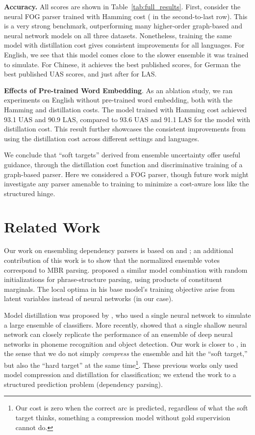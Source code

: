 \documentclass[11pt,letterpaper]{article}
\newcommand{\ignore}[1]{}
\newcommand{\lingpengcomment}[1]{\ignore{\textcolor{green}{{\textbf{[#1 --\textsc{lpk}]}}}}}
\newcommand{\miguelcomment}[1]{\ignore{\textcolor{red}{{\textbf{[#1 --\textsc{miguel}]}}}}}
\begin{document}
\textbf{Accuracy.}  All scores are shown in Table~\ref{tab:full_results}.
First, consider the neural FOG parser trained with Hamming cost ( in the second-to-last row).  This is a very strong benchmark, \ignore{\miguelcomment{Difficult to call it "baseline" if it is the best result reported...}}outperforming many higher-order graph-based and neural network models on all three datasets.  Nonetheless, training the same model with distillation cost gives consistent improvements for all languages.
For English, we see that this model comes close to the slower ensemble it was trained to simulate.  For Chinese, it achieves the best published scores, for German the best published UAS scores, and just after  for LAS.

\textbf{Effects of Pre-trained Word Embedding}. As an ablation study, we ran experiments on English without pre-trained word embedding, both with the Hamming and distillation costs. The model trained with Hamming cost achieved 93.1 UAS and 90.9 LAS, compared to 93.6 UAS and 91.1 LAS for the model with distillation cost. This result further showcases the consistent improvements from using the distillation cost across different settings and languages.

We conclude that ``soft targets'' derived from ensemble uncertainty offer useful guidance, through the distillation cost function and discriminative training
of a graph-based parser.  Here we considered a FOG parser, though future work might investigate any parser amenable to training to minimize a cost-aware  loss like the structured hinge.

\section{Related Work}
Our work on ensembling dependency parsers is based on  and ; an additional contribution of this work is to show that the normalized\ignore{\lingpengcomment{normalized before and normalised here...}} ensemble votes correspond to MBR parsing.  proposed a similar model combination with random initializations for phrase-structure parsing, using products of constituent marginals. The local optima in his base model's training objective arise from latent variables instead of neural networks (in our case).

Model distillation was proposed by , who used a single neural network to simulate a large ensemble of classifiers.  More recently,  showed that a single {shallow} neural network can closely replicate the performance of an ensemble of {deep} neural networks in phoneme recognition and object detection. Our work is closer to , in the sense that we do not simply \emph{compress} the  ensemble and hit the ``soft target,'' but also the ``hard target'' at the same time\footnote{Our cost is zero when the correct arc is predicted, regardless of what the soft target thinks, something a compression model without gold supervision cannot do.}. These previous works only used model compression and distillation for classification; we extend the work to a structured prediction problem (dependency parsing).
\end{document}
